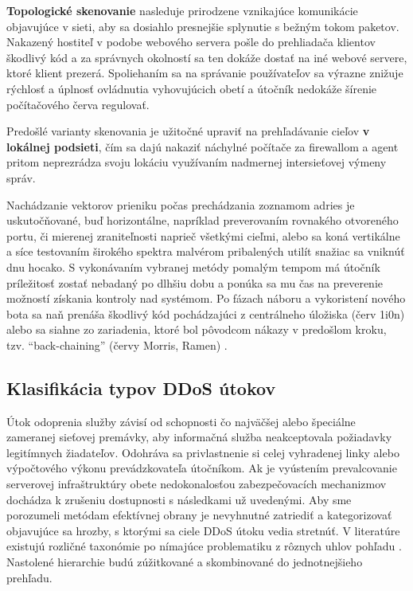 \documentclass[12pt, a4paper]{article}
\begin{document}
\textbf{Topologické skenovanie} nasleduje prirodzene vznikajúce komunikácie objavujúce v sieti, aby
sa dosiahlo presnejšie splynutie s bežným tokom paketov. Nakazený hostiteľ v podobe webového servera 
pošle do prehliadača klientov škodlivý kód a za správnych okolností sa ten dokáže dostať na iné webové
servere, ktoré klient prezerá. Spoliehaním sa na správanie používateľov sa výrazne znižuje rýchlosť a 
úplnosť ovládnutia vyhovujúcich obetí a útočník nedokáže šírenie počítačového červa regulovať.

Predošlé varianty skenovania je užitočné upraviť na prehľadávanie cieľov \textbf{v lokálnej podsieti}, 
čím sa dajú nakaziť náchylné počítače za firewallom a agent pritom neprezrádza svoju lokáciu využívaním
nadmernej intersieťovej výmeny správ.   

Nachádzanie vektorov prieniku počas prechádzania zoznamom adries je uskutočňované, buď horizontálne,
napríklad preverovaním rovnakého otvoreného portu, či mierenej zraniteľnosti naprieč všetkými cieľmi, alebo
sa koná vertikálne a síce testovaním širokého spektra malvérom pribalených utilít snažiac sa vniknúť
dnu hocako. S vykonávaním vybranej metódy pomalým tempom má útočník príležitosť zostať nebadaný po dlhšiu
dobu a ponúka sa mu čas na preverenie možností získania kontroly nad systémom. Po fázach náboru a 
vykoristení nového bota sa naň prenáša škodlivý kód pochádzajúci z centrálneho úložiska (červ 1i0n) alebo
sa siahne zo zariadenia, ktoré bol pôvodcom nákazy v predošlom kroku, tzv. \enquote{back-chaining} (červy
Morris, Ramen) \cite{ddos-anatomy-2004}. 

\subsection{Klasifikácia typov DDoS útokov}
Útok odoprenia služby závisí od schopnosti čo najväčšej alebo špeciálne zameranej sieťovej 
premávky, aby informačná služba neakceptovala požiadavky legitímnych žiadateľov. Odohráva sa
privlastnenie si celej vyhradenej linky alebo výpočtového výkonu prevádzkovateľa útočníkom. 
Ak je vyústením prevalcovanie serverovej infraštruktúry obete nedokonalosťou zabezpečovacích 
mechanizmov dochádza k zrušeniu dostupnosti s následkami už uvedenými. Aby sme porozumeli metódam 
efektívnej obrany je nevyhnutné zatriediť a kategorizovať objavujúce sa
hrozby, s ktorými sa ciele DDoS útoku vedia stretnúť. V literatúre existujú rozličné taxonómie po
nímajúce problematiku z rôznych uhlov pohľadu \cite{ddos-attacks} \cite{botnets} \cite{ddos-anatomy-2004} 
\cite{csirt-ddos}. Nastolené hierarchie budú zúžitkované a skombinované do jednotnejšieho prehľadu.
\end{document}
